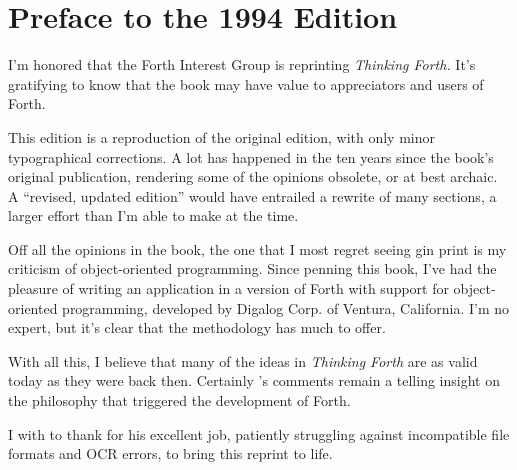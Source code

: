 \chapter*{Preface to the 1994 Edition}

I'm honored that the Forth Interest Group is reprinting \emph{Thinking
Forth.} It's gratifying to know that the book may have value to
appreciators and users of Forth.

This edition is a reproduction of the original edition, with only
minor typographical corrections. A lot has happened in the ten years
since the book's original publication, rendering some of the opinions
obsolete, or at best archaic. A ``revised, updated edition'' would
have entrailed a rewrite of many sections, a larger effort than I'm
able to make at the time.

Off all the opinions in the book, the one that I most regret seeing gin
print is my criticism of object-oriented programming. Since penning
this book, I've had the pleasure of writing an application in a
version of Forth with support for object-oriented programming,
developed by Digalog Corp. of Ventura, California. I'm no expert, but
it's clear that the methodology has much to offer.

With all this, I believe that many of the ideas in \emph{Thinking
Forth} are as valid today as they were back then. Certainly 's comments remain a telling insight on the philosophy that
triggered the development of Forth.

I with to thank  for his excellent job, patiently
struggling against incompatible file formats and OCR errors, to bring
this reprint to life.
